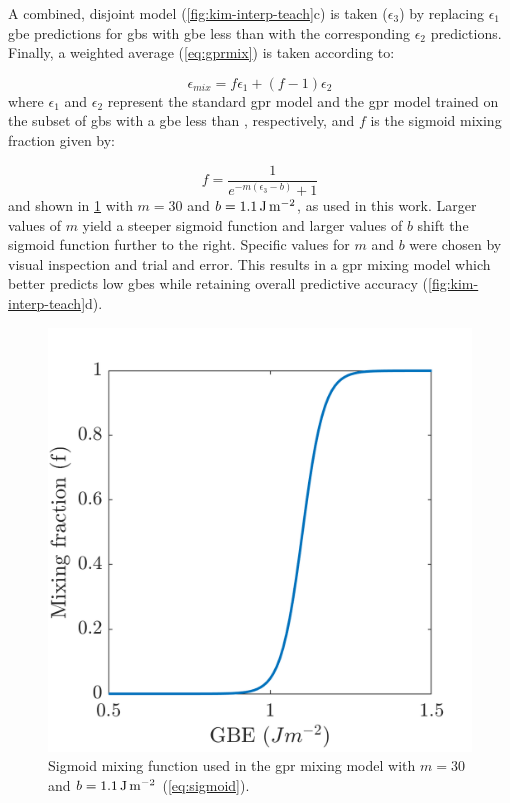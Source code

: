 \documentclass[preprint,12pt]{elsarticle}
\begin{document}
A combined, disjoint model (\cref{fig:kim-interp-teach}c) is taken ($\epsilon_3$) by replacing $\epsilon_1$ \gls{gbe} predictions for \glspl{gb} with \gls{gbe} less than \thr{} with the corresponding $\epsilon_2$ predictions. Finally, a weighted average (\cref{eq:gprmix}) is taken according to:

\begin{equation}
    \epsilon_{mix} = f \epsilon_1+(f-1) \epsilon_2
    \label{eq:gprmix}
\end{equation}
where $\epsilon_1$ and $\epsilon_2$ represent the standard \gls{gpr} model and the \gls{gpr} model trained on the subset of \glspl{gb} with a \gls{gbe} less than \thrtwo{}, respectively, and $f$ is the sigmoid mixing fraction given by:

\begin{equation}
    f=\frac{1}{e^{-m \left(\epsilon_3-b\right)}+1}
    \label{eq:sigmoid}
\end{equation}
and shown in \cref{fig:gprmix-sigmoid} with $m=30$ and $b=\SI{1.1}{\joule\per\square\meter}{}$, as used in this work. Larger values of $m$ yield a steeper sigmoid function and larger values of $b$ shift the sigmoid function further to the right. Specific values for $m$ and $b$ were chosen by visual inspection and trial and error. This results in a \gls{gpr} mixing model which better predicts low \glspl{gbe} while retaining overall predictive accuracy (\cref{fig:kim-interp-teach}d).

\begin{figure}
    \centering
    \includegraphics[scale=1]{figures/gprmix-sigmoid.png}
    \caption{Sigmoid mixing function used in the \gls{gpr} mixing model with $m=30$ and $b=\SI{1.1}{\joule\per\square\meter}{}$ (\cref{eq:sigmoid}).}
    \label{fig:gprmix-sigmoid}
\end{figure}
\end{document}
